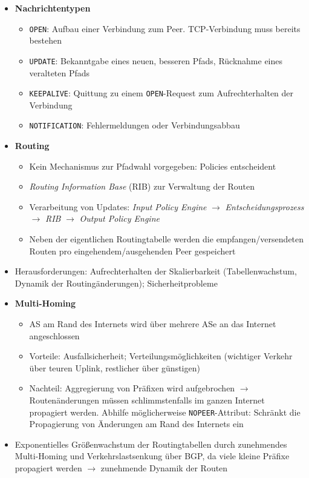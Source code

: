 \begin{itemize}
	\item \textbf{Nachrichtentypen}
	\begin{itemize}
		\item \texttt{OPEN}: Aufbau einer Verbindung zum Peer. TCP-Verbindung muss bereits bestehen
		\item \texttt{UPDATE}: Bekanntgabe eines neuen, besseren Pfads, Rücknahme eines veralteten Pfads
		\item \texttt{KEEPALIVE}: Quittung zu einem \texttt{OPEN}-Request zum Aufrechterhalten der Verbindung
		\item \texttt{NOTIFICATION}: Fehlermeldungen oder Verbindungsabbau
	\end{itemize}
	\item \textbf{Routing}
	\begin{itemize}
		\item Kein Mechanismus zur Pfadwahl vorgegeben: Policies entscheident
		\item \textit{Routing Information Base} (RIB) zur Verwaltung der Routen
		\item Verarbeitung von Updates: \textit{Input Policy Engine} \(\rightarrow\) \textit{Entscheidungsprozess} \(\rightarrow\) \textit{RIB} \(\rightarrow\) \textit{Output Policy Engine}
		\item Neben der eigentlichen Routingtabelle werden die empfangen/versendeten Routen pro eingehendem/ausgehenden Peer gespeichert
	\end{itemize}
	\item Herausforderungen: Aufrechterhalten der Skalierbarkeit (Tabellenwachstum, Dynamik der Routingänderungen); Sicherheitprobleme
	\item \textbf{Multi-Homing}
	\begin{itemize}
		\item AS am Rand des Internets wird über mehrere ASe an das Internet angeschlossen
		\item Vorteile: Ausfallsicherheit; Verteilungsmöglichkeiten (wichtiger Verkehr über teuren Uplink, restlicher über günstigen)
		\item Nachteil: Aggregierung von Präfixen wird aufgebrochen \(\rightarrow\) Routenänderungen müssen schlimmstenfalls im ganzen Internet propagiert werden. Abhilfe möglicherweise \texttt{NOPEER}-Attribut: Schränkt die Propagierung von Änderungen am Rand des Internets ein
	\end{itemize}
	\item Exponentielles Größenwachstum der Routingtabellen durch zunehmendes Multi-Homing und Verkehrslastsenkung über BGP, da viele kleine Präfixe propagiert werden \(\rightarrow\) zunehmende Dynamik der Routen

\end{itemize}
